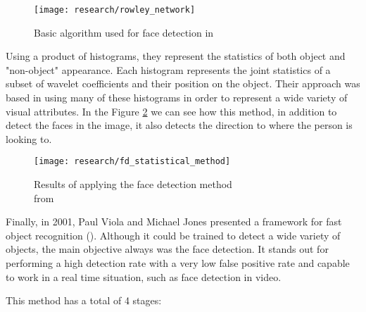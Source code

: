 	\clearpage

	\begin{figure}[!ht]
		\centering
		\texttt{[image: research/rowley\_network]}
		\caption{Basic algorithm used for face detection in \cite{rowley1998neural}}
		\label{fig:rowley_network}
	\end{figure}

	Using a product of histograms, they represent the statistics of both object and "non-object" appearance. Each histogram represents the joint statistics of a subset of wavelet coefficients and their position on the object. Their approach was based in using many of these histograms in order to represent a wide variety of visual attributes. In the Figure \ref{fig:statistical_method_face_det} we can see how this method, in addition to detect the faces in the image, it also detects the direction to where the person is looking to.

	\begin{figure}[!ht]
		\centering
		\texttt{[image: research/fd\_statistical\_method]}
		\caption{Results of applying the face detection method \\from \cite{schneiderman2000statistical}}
		\label{fig:statistical_method_face_det}
	\end{figure}

	Finally, in 2001, Paul Viola and Michael Jones presented a framework for fast object recognition (\cite{viola2001rapid}). Although it could be trained to detect a wide variety of objects, the main objective always was the face detection. It stands out for performing a high detection rate with a very low false positive rate and capable to work in a real time situation, such as face detection in video.

	This method has a total of 4 stages:
	
	\vspace{-0.15cm}

